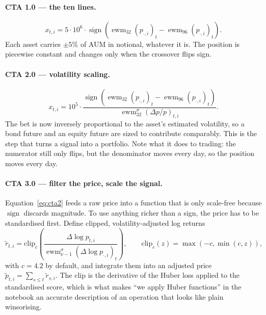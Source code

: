 \documentclass[11pt,a4paper]{article}
\DeclareMathOperator{\sgn}{sign}
\DeclareMathOperator{\ewm}{ewm}
\begin{document}
\paragraph{CTA 1.0 --- the ten lines.}
\begin{equation}
  x_{t,i} = 5 \cdot 10^{6} \cdot
  \sgn\!\left( \ewm_{32}(p_{\cdot,i})_t - \ewm_{96}(p_{\cdot,i})_t \right).
  \label{eq:cta1}
\end{equation}
Each asset carries $\pm 5\%$ of AUM in notional, whatever it is. The position
is piecewise constant and changes only when the crossover flips sign.

\paragraph{CTA 2.0 --- volatility scaling.}
\begin{equation}
  x_{t,i} = 10^{5} \cdot
  \frac{\sgn\!\left( \ewm_{32}(p_{\cdot,i})_t - \ewm_{96}(p_{\cdot,i})_t \right)}
       {\ewm^{\sigma}_{32}\!\left( \Delta p / p \right)_{t,i}} .
  \label{eq:cta2}
\end{equation}
The bet is now inversely proportional to the asset's estimated volatility, so
a bond future and an equity future are sized to contribute comparably. This is
the step that turns a signal into a portfolio. Note what it does to trading:
the numerator still only flips, but the denominator moves every day, so the
position moves every day.

\paragraph{CTA 3.0 --- filter the price, scale the signal.}
Equation~\eqref{eq:cta2} feeds a raw price into a function that is only
scale-free because $\sgn$ discards magnitude. To use anything richer than a
sign, the price has to be standardised first. Define clipped,
volatility-adjusted log returns
\begin{equation}
  \tilde r_{t,i} =
  \mathrm{clip}_{c}\!\left(
    \frac{\Delta \log p_{t,i}}{\ewm^{\sigma}_{\nu-1}(\Delta \log p_{\cdot,i})_t}
  \right),
  \qquad
  \mathrm{clip}_{c}(z) = \max(-c, \min(c, z)),
  \label{eq:voladj}
\end{equation}
with $c = 4.2$ by default, and integrate them into an adjusted price
$\tilde p_{t,i} = \sum_{s \le t} \tilde r_{s,i}$. The clip is the derivative
of the Huber loss \citep{huber1964} applied to the standardised score, which
is what makes ``we apply Huber functions'' in the notebook an accurate
description of an operation that looks like plain winsorising.
\end{document}
